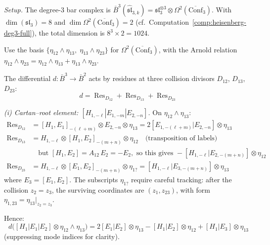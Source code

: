 \begin{computation}
\label{comp:sl3-degree3-complete}

\emph{Setup.}
The degree-3 bar complex is
$\bar{B}^3(\widehat{\mathfrak{sl}}_{3,k}) = \mathfrak{sl}_3^{\otimes 3}
\otimes \Omega^2(\overline{\mathrm{Conf}}_3)$.
With $\dim(\mathfrak{sl}_3) = 8$ and
$\dim \Omega^2(\overline{\mathrm{Conf}}_3) = 2$
(cf.\ Computation~\ref{comp:heisenberg-deg3-full}), the total dimension is
$8^3 \times 2 = 1024$.

Use the basis $\{\eta_{12}\wedge\eta_{13},\; \eta_{13}\wedge\eta_{23}\}$
for $\Omega^2(\overline{\mathrm{Conf}}_3)$, with the Arnold relation
$\eta_{12}\wedge\eta_{23} = \eta_{12}\wedge\eta_{13} + \eta_{13}\wedge\eta_{23}$.

The differential $d\colon \bar{B}^3 \to \bar{B}^2$ acts by residues at three
collision divisors $D_{12}$, $D_{13}$, $D_{23}$:
\[
d = \operatorname{Res}_{D_{12}} + \operatorname{Res}_{D_{13}} + \operatorname{Res}_{D_{23}}
\]

\emph{(i) Cartan--root element: $[H_{1,-\ell}|E_{1,-m}|E_{2,-n}]$.}
On $\eta_{12} \wedge \eta_{13}$:
\begin{align*}
\operatorname{Res}_{D_{12}} &= [H_1, E_1]_{-(\ell+m)} \otimes E_{2,-n} \otimes \eta_{13}
= 2[E_{1,-(\ell+m)}|E_{2,-n}] \otimes \eta_{13} \\
\operatorname{Res}_{D_{13}} &= H_{1,-\ell} \otimes [H_1, E_2]_{-(m+n)} \otimes \eta_{12}
\quad\text{(transposition of labels)} \\
&\quad\text{but } [H_1, E_2] = A_{12}\,E_2 = -E_2, \text{ so this gives }
-[H_{1,-\ell}|E_{2,-(m+n)}] \otimes \eta_{12} \\
\operatorname{Res}_{D_{23}} &= H_{1,-\ell} \otimes [E_1, E_2]_{-(m+n)} \otimes \eta_{1?}
= [H_{1,-\ell}|E_{3,-(m+n)}] \otimes \eta_{13}
\end{align*}
where $E_3 = [E_1, E_2]$. The subscripts $\eta_{1?}$ require careful tracking:
after the collision $z_2 = z_3$, the surviving coordinates are $(z_1, z_{23})$,
with form $\eta_{1,23} = \eta_{13}|_{z_2=z_3}$.

Hence:
\begin{equation}d\bigl([H_{1}|E_1|E_2] \otimes \eta_{12}\wedge\eta_{13}\bigr)
= 2[E_1|E_2] \otimes \eta_{13}
- [H_1|E_2] \otimes \eta_{12}
+ [H_1|E_3] \otimes \eta_{13}
\end{equation}
(suppressing mode indices for clarity).


\end{computation}
